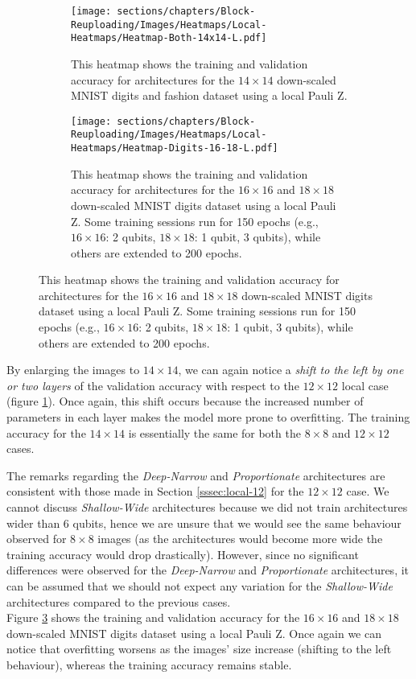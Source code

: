 \begin{figure}[h]
    \centering
    \begin{subfigure}
        \centering
        \texttt{[image: sections/chapters/Block-Reuploading/Images/Heatmaps/Local-Heatmaps/Heatmap-Both-14x14-L.pdf]}
        \caption*{This heatmap shows the training and validation accuracy for architectures for the $14\times14$ down-scaled MNIST digits and fashion dataset using a local Pauli Z.}
        \label{fig:heatmap-14x14-L}
    \end{subfigure}
    \begin{subfigure}
        \centering
        \texttt{[image: sections/chapters/Block-Reuploading/Images/Heatmaps/Local-Heatmaps/Heatmap-Digits-16-18-L.pdf]}
        \caption*{This heatmap shows the training and validation accuracy for architectures for the $16\times16$ and 
        $18\times18$ down-scaled MNIST digits dataset using a local Pauli Z.
        Some training sessions run for 150 epochs (e.g., $16\times16$: 2 qubits, $18\times18$: 
        1 qubit, 3 qubits), while others are extended to 200 epochs.}
        \label{fig:heatmap-16x16-L}
    \end{subfigure}
\end{figure}


By enlarging the images to $14\times14$, we can again notice a \textit{shift to the left by 
one or two layers} of the validation accuracy with respect to the $12\times12$ local case (figure 
\ref{fig:heatmap-14x14-L}). Once again, this shift 
occurs because the increased number of parameters in each layer makes the model more prone to overfitting.
The training accuracy for the $14\times14$ is essentially the same for both the $8\times8$ and 
$12\times12$ cases.

The remarks regarding the \textit{Deep-Narrow} and \textit{Proportionate} architectures are consistent 
with those made in Section \ref{sssec:local-12} for the $12\times12$ case.
We cannot discuss \textit{Shallow-Wide} architectures because we did not train architectures wider
than 6 qubits, hence we are unsure that we would see the same behaviour observed for $8\times8$ 
images (as the architectures would become more wide the training accuracy would drop drastically).
However, since no significant differences were observed for the \textit{Deep-Narrow} 
and \textit{Proportionate} architectures, it can be assumed that we should not expect any variation 
for the \textit{Shallow-Wide} architectures compared to the previous cases.\\

Figure \ref{fig:heatmap-16x16-L} shows the training and validation accuracy for the $16\times16$ and 
$18\times18$ down-scaled MNIST digits dataset using a local Pauli Z.
Once again we can notice that overfitting worsens as the images' size increase (shifting to the left behaviour), 
whereas the training accuracy remains stable.


